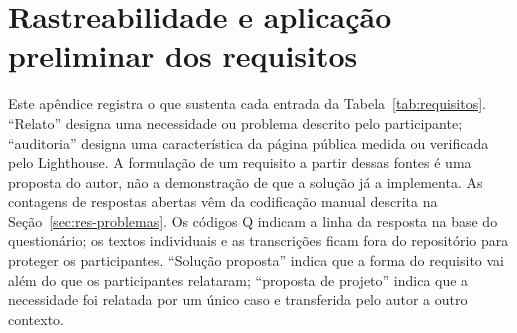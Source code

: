 \chapter{Rastreabilidade e aplicação preliminar dos requisitos}
\label{ap:requisitos}

Este apêndice registra o que sustenta cada entrada da Tabela~\ref{tab:requisitos}. ``Relato'' designa uma necessidade ou problema descrito pelo participante; ``auditoria'' designa uma característica da página pública medida ou verificada pelo Lighthouse. A formulação de um requisito a partir dessas fontes é uma proposta do autor, não a demonstração de que a solução já a implementa. As contagens de respostas abertas vêm da codificação manual descrita na Seção~\ref{sec:res-problemas}. Os códigos Q indicam a linha da resposta na base do questionário; os textos individuais e as transcrições ficam fora do repositório para proteger os participantes. ``Solução proposta'' indica que a forma do requisito vai além do que os participantes relataram; ``proposta de projeto'' indica que a necessidade foi relatada por um único caso e transferida pelo autor a outro contexto.

